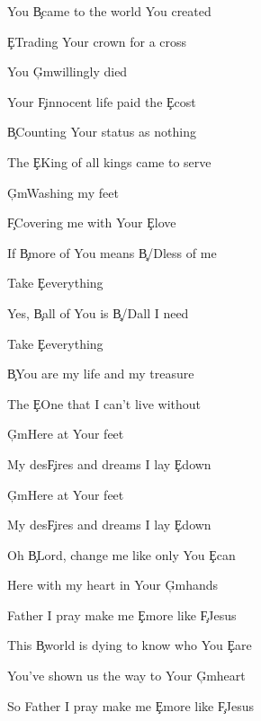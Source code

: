 \documentclass[9pt]{extarticle}
\begin{document}
\bsong

\bi

\ei

\bv
You \c{B}came to the world You created

\c{E}Trading Your crown for a cross

You \c{G\s m}willingly died

Your \c{F\s }innocent life paid the \c{E}cost
\ev

\bv
\c{B}Counting Your status as nothing

The \c{E}King of all kings came to serve

\c{G\s m}Washing my feet

\c{F\s }Covering me with Your \c{E}love
\ev

\bc
If \c{B}more of You means \c{B/D\s }less of me

Take \c{E}everything

Yes, \c{B}all of You is \c{B/D\s }all I need

Take \c{E}everything
\ec

\bv
\c{B}You are my life and my treasure

The \c{E}One that I can't live without

\c{G\s m}Here at Your feet

My des\c{F\s }ires and dreams I lay \c{E}down

\c{G\s m}Here at Your feet

My des\c{F\s }ires and dreams I lay \c{E}down
\ev


\bb[2]
Oh \c{B}Lord, change me like only You \c{E}can

Here with my heart in Your \c{G\s m}hands

Father I pray make me \c{E}more like \c{F\s }Jesus

This \c{B}world is dying to know who You \c{E}are

You've shown us the way to Your \c{G\s m}heart

So Father I pray make me \c{E}more like \c{F\s }Jesus
\eb


\esong
\end{document}
